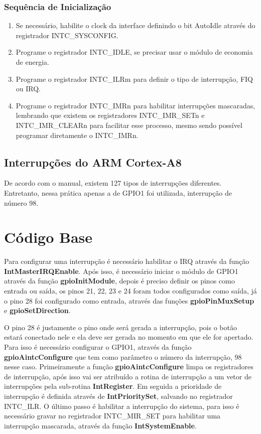\documentclass[12pt]{article}
\begin{document}
			\subsubsection{Sequência de Inicialização}
				\begin{enumerate}
					\item Se necessário, habilite o clock da interface definindo o bit AutoIdle através do registrador INTC\_SYSCONFIG.
					\item Programe o registrador INTC\_IDLE, se precisar usar o módulo de economia de energia.
					\item Programe o registrador INTC\_ILRm para definir o tipo de interrupção, FIQ ou IRQ.
					\item Programe o registrador INTC\_IMRn para habilitar interrupções mascaradas, lembrando que existem os registradores INTC\_IMR\_SETn e INTC\_IMR\_CLEARn para facilitar esse processo, mesmo sendo possível programar diretamente o INTC\_IMRn.
				\end{enumerate}
		\subsection{Interrupções do ARM Cortex-A8}
			De acordo com o manual, existem 127 tipos de interrupções diferentes. Entretanto, nessa prática apenas a de GPIO1 foi utilizada, interrupção de número 98.
\section{Código Base}
	Para configurar uma interrupção é necessário habilitar o IRQ através da função \textbf{IntMasterIRQEnable}. Após isso, é necessário iniciar o módulo de GPIO1 através da função \textbf{gpioInitModule}, depois é preciso definir os pinos como entrada ou saída, os pinos 21, 22, 23 e 24 foram todos configurados como saída, já o pino 28 foi configurado como entrada, através das funções \textbf{gpioPinMuxSetup} e \textbf{gpioSetDirection}. \
	
	O pino 28 é justamente o pino onde será gerada a interrupção, pois o botão estará conectado nele e ela deve ser gerada no momento em que ele for apertado. Para isso é necessário configurar o GPIO1, através da função \textbf{gpioAintcConfigure} que tem como parâmetro o número da interrupção, 98 nesse caso. Primeiramente a função \textbf{gpioAintcConfigure} limpa os registradores de interrupção, após isso vai ser atribuído a rotina de interrupção a um vetor de interrupções pela sub-rotina \textbf{IntRegister}. Em seguida a prioridade de interrupção é definida através de \textbf{IntPrioritySet}, salvando no registrador INTC\_ILR. O último passo é habilitar a interrupção do sistema, para isso é necessário gravar no registrador INTC\_MIR\_SET para habilitar uma interrupção mascarada, através da função \textbf{IntSystemEnable}. \
	
\end{document}
